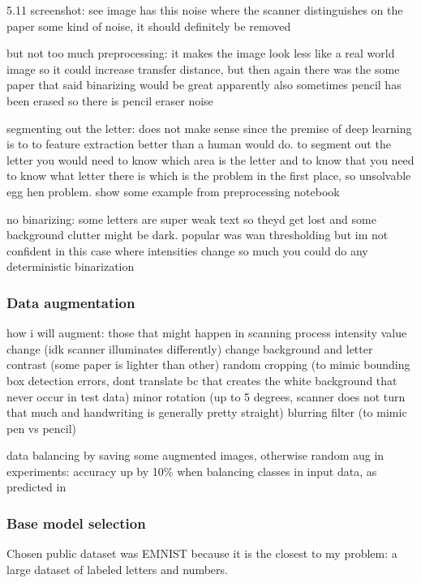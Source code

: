 \documentclass{article}
\begin{document}
5.11 screenshot: see image has this noise where the scanner distinguishes on the paper some kind of noise, it should definitely be removed

but not too much preprocessing: it makes the image look less like a real world image so it could increase transfer distance, 
but then again there was the some paper that said binarizing would be great
apparently also sometimes pencil has been erased so there is pencil eraser noise

segmenting out the letter: does not make sense since the premise of deep learning is 
to to feature extraction better than a human would do. to segment out the letter you would 
need to know which area is the letter and to know that you need to know what letter there 
is which is the problem in the first place, so unsolvable egg hen problem. show some example from preprocessing notebook

no binarizing: some letters are super weak text so theyd get lost and some background clutter might be dark.
popular was wan thresholding but im not confident in this case where intensities change so much you could 
do any deterministic binarization

\subsubsection{Data augmentation}

how i will augment: those that might happen in scanning process
intensity value change (idk scanner illuminates differently)
change background and letter contrast (some paper is lighter than other)
random cropping (to mimic bounding box detection errors, dont translate bc that creates the white background that never occur in test data)
minor rotation (up to 5 degrees, scanner does not turn that much and handwriting is generally pretty straight)
blurring filter (to mimic pen vs pencil)

data balancing by saving some augmented images, otherwise random aug
in experiments: accuracy up by 10\% when balancing classes in input data, 
as predicted in \cite{heLearningImbalancedData2009}

\subsubsection{Base model selection}

Chosen public dataset was EMNIST \cite{emnist} because it is the closest to my problem: a large dataset of labeled letters and numbers.
\end{document}

